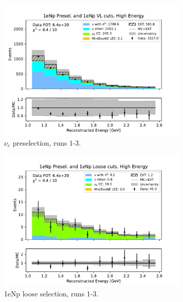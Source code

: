 \begin{figure}[H]
    \centering
    \begin{subfigure}{0.33\linewidth}
    \includegraphics[width=\linewidth]{technote/Sidebands/Figures/FarSideband/far_sideband_reco_e_run123_NP_NP_HIGH_ENERGY.pdf}
    \caption{$\nu_e$ preselection, runs 1-3.}
    \end{subfigure}%
    \begin{subfigure}{0.33\linewidth}
    \includegraphics[width=\linewidth]{technote/Sidebands/Figures/FarSideband/far_sideband_reco_e_run123_NP_NPL_HIGH_ENERGY.pdf}
    \caption{1eNp loose selection, runs 1-3.}
    \end{subfigure}%
    \begin{subfigure}{0.33\linewidth}

\end{subfigure}
\end{figure}
